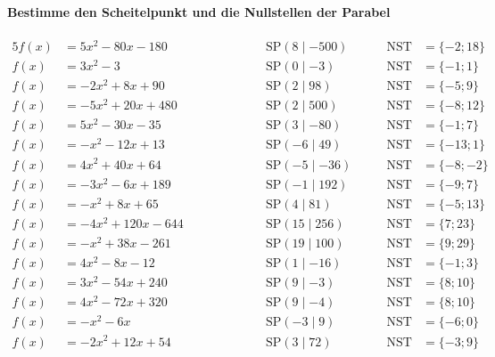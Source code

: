 \documentclass
[
  draft    = true,
  fontsize = 11pt,
  parskip  = half-,
  BCOR     = 0pt,
  DIV      = 11
]
{scrartcl}
\begin{document}
\paragraph{Bestimme den Scheitelpunkt und die Nullstellen der Parabel}
\begin{alignat*}{5}
  f(x)&=5x^{2}-80x-180 \qquad&\qquad \quad&\text{SP}(8\mid-500) \quad&\quad \text{NST}&=\{-2;18\} \\[0.5ex]
  f(x)&=3x^{2}-3 \qquad&\qquad \quad&\text{SP}(0\mid-3) \quad&\quad \text{NST}&=\{-1;1\} \\[0.5ex]
  f(x)&=-2x^{2}+8x+90 \qquad&\qquad \quad&\text{SP}(2\mid98) \quad&\quad \text{NST}&=\{-5;9\} \\[0.5ex]
  f(x)&=-5x^{2}+20x+480 \qquad&\qquad \quad&\text{SP}(2\mid500) \quad&\quad \text{NST}&=\{-8;12\} \\[0.5ex]
  f(x)&=5x^{2}-30x-35 \qquad&\qquad \quad&\text{SP}(3\mid-80) \quad&\quad \text{NST}&=\{-1;7\} \\[0.5ex]
  f(x)&=-x^{2}-12x+13 \qquad&\qquad \quad&\text{SP}(-6\mid49) \quad&\quad \text{NST}&=\{-13;1\} \\[0.5ex]
  f(x)&=4x^{2}+40x+64 \qquad&\qquad \quad&\text{SP}(-5\mid-36) \quad&\quad \text{NST}&=\{-8;-2\} \\[0.5ex]
  f(x)&=-3x^{2}-6x+189 \qquad&\qquad \quad&\text{SP}(-1\mid192) \quad&\quad \text{NST}&=\{-9;7\} \\[0.5ex]
  f(x)&=-x^{2}+8x+65 \qquad&\qquad \quad&\text{SP}(4\mid81) \quad&\quad \text{NST}&=\{-5;13\} \\[0.5ex]
  f(x)&=-4x^{2}+120x-644 \qquad&\qquad \quad&\text{SP}(15\mid256) \quad&\quad \text{NST}&=\{7;23\} \\[0.5ex]
  f(x)&=-x^{2}+38x-261 \qquad&\qquad \quad&\text{SP}(19\mid100) \quad&\quad \text{NST}&=\{9;29\} \\[0.5ex]
  f(x)&=4x^{2}-8x-12 \qquad&\qquad \quad&\text{SP}(1\mid-16) \quad&\quad \text{NST}&=\{-1;3\} \\[0.5ex]
  f(x)&=3x^{2}-54x+240 \qquad&\qquad \quad&\text{SP}(9\mid-3) \quad&\quad \text{NST}&=\{8;10\} \\[0.5ex]
  f(x)&=4x^{2}-72x+320 \qquad&\qquad \quad&\text{SP}(9\mid-4) \quad&\quad \text{NST}&=\{8;10\} \\[0.5ex]
  f(x)&=-x^{2}-6x \qquad&\qquad \quad&\text{SP}(-3\mid9) \quad&\quad \text{NST}&=\{-6;0\} \\[0.5ex]
  f(x)&=-2x^{2}+12x+54 \qquad&\qquad \quad&\text{SP}(3\mid72) \quad&\quad \text{NST}&=\{-3;9\} \\[0.5ex]

\end{alignat*}
\end{document}
